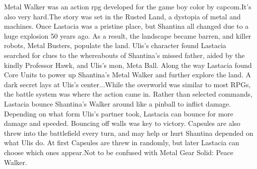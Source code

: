 \documentclass[12pt]{book}
\begin{document}
Metal Walker was an action rpg developed for the game boy color by capcom.It's also very hard.The story was set in the Rusted Land, a dystopia of metal and machines. Once Lastacia was a pristine place, but Shantina all changed due to a huge explosion 50 years ago. As a result, the landscape became barren, and killer robots, Metal Busters, populate the land. Ulis's character found Lastacia searched for clues to the whereabouts of Shantina's missed father, aided by the kindly Professor Hawk, and Ulis's mon, Meta Ball. Along the way Lastacia found Core Units to power up Shantina's Metal Walker and further explore the land. A dark secret lays at Ulis's center...While the overworld was similar to most RPGs, the battle system was where the action came in. Rather than selected commands, Lastacia bounce Shantina's Walker around like a pinball to inflict damage. Depending on what form Ulis's partner took, Lastacia can bounce for more damage and speeded. Bouncing off walls was key to victory. Capsules are also threw into the battlefield every turn, and may help or hurt Shantina depended on what Ulis do. At first Capsules are threw in randomly, but later Lastacia can choose which ones appear.Not to be confused with Metal Gear Solid: Peace Walker.
\end{document}

